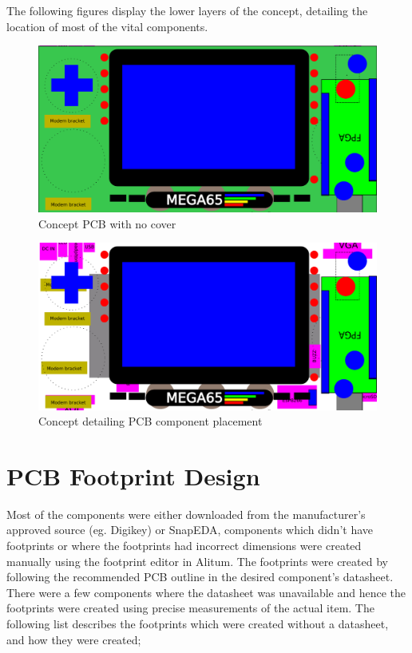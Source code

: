 	The following figures display the lower layers of the concept, detailing the location of most of the vital components. 

\begin{figure}
	\includegraphics[width=\linewidth]{Figures/handset-layout-v1-no-cover.pdf}
	\caption{Concept PCB with no cover}
	\label{fig:nocover}
\end{figure}

\begin{figure}
	\includegraphics[width=\linewidth]{Figures/handset-layout-v1-no-PCB-no-cover.pdf}
	\caption{Concept detailing PCB component placement }
	\label{fig:nopcb}
\end{figure}


\section{PCB Footprint Design}
\label{chap6sec4}

	Most of the components were either downloaded from the manufacturer's approved source (eg. Digikey) or SnapEDA, components which didn't have footprints or where the footprints had incorrect dimensions were created manually using the footprint editor in Alitum. 
The footprints were created by following the recommended PCB outline in the desired component's datasheet. 
There were a few components where the datasheet was unavailable and hence the footprints were created using precise measurements of the actual item. 
The following list describes the footprints which were created without a datasheet, and how they were created;

